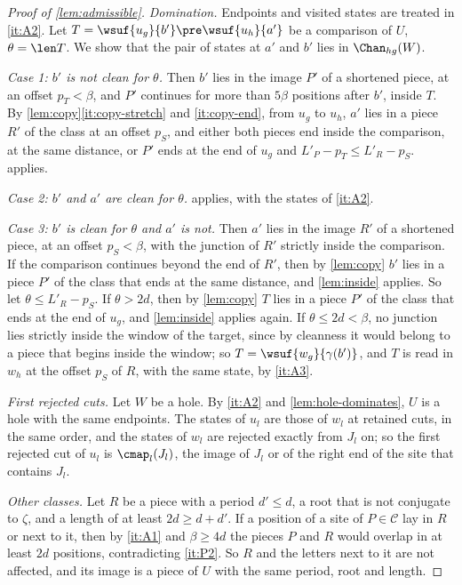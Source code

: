 \begin{proof}[Proof of \cref{lem:admissible}]
\emph{Domination.} Endpoints and visited states are treated in
\ref{it:A2}. Let $T=\wsuf{u_g}{b'}\pre\wsuf{u_h}{a'}$ be a comparison of
$U$, $\theta=\len T$. We show that the pair of states at $a'$ and $b'$ lies in
$\Chan_{hg}(W)$.

\emph{Case 1: $b'$ is not clean for $\theta$.} Then $b'$ lies in the image $P'$
of a shortened piece, at an offset $p_T<\beta$, and $P'$ continues for more
than $5\beta$ positions after $b'$, inside $T$. By
\cref{lem:copy}\eqref{it:copy-stretch} and \eqref{it:copy-end}, from $u_g$
to $u_h$, $a'$ lies in a piece $R'$ of the class at an offset $p_S$, and
either both pieces end inside the comparison, at the same distance, or $P'$
ends at the end of $u_g$ and $L'_P-p_T\le L'_R-p_S$.
 applies.

\emph{Case 2: $b'$ and $a'$ are clean for $\theta$.}  applies,
with the states of \ref{it:A2}.

\emph{Case 3: $b'$ is clean for $\theta$ and $a'$ is not.} Then $a'$ lies in the
image $R'$ of a shortened piece, at an offset $p_S<\beta$, with the junction
of $R'$ strictly inside the comparison. If the comparison continues beyond
the end of $R'$, then by \cref{lem:copy} $b'$ lies in a piece $P'$ of the
class that ends at the same distance, and \cref{lem:inside} applies. So let
$\theta\le L'_R-p_S$. If $\theta>2d$, then by \cref{lem:copy} $T$ lies in a piece $P'$
of the class that ends at the end of $u_g$, and \cref{lem:inside} applies
again. If $\theta\le2d<\beta$, no junction lies strictly inside the window of the
target, since by cleanness it would belong to a piece that begins inside the
window; so $T=\wsuf{w_g}{\gamma(b')}$, and $T$ is read in $w_h$ at the offset
$p_S$ of $R$, with the same state, by \ref{it:A3}.

\emph{First rejected cuts.} Let $W$ be a hole. By \ref{it:A2} and
\cref{lem:hole-dominates}, $U$ is a hole with the same endpoints. The
states of $u_l$ are those of $w_l$ at retained cuts, in the same order, and
the states of $w_l$ are rejected exactly from $J_l$ on; so the first
rejected cut of $u_l$ is $\cmap_l(J_l)$, the image of $J_l$ or of the right
end of the site that contains $J_l$.

\emph{Other classes.} Let $R$ be a piece with a period $d'\le d$, a root
that is not conjugate to $\zeta$, and a length of at least $2d\ge d+d'$. If
a position of a site of $P\in\mathcal C$ lay in $R$ or next to it, then by
\ref{it:A1} and $\beta\ge4d$ the pieces $P$ and $R$ would overlap in at
least $2d$ positions, contradicting \ref{it:P2}. So $R$ and the letters
next to it are not affected, and its image is a piece of $U$ with the same
period, root and length.
\end{proof}


